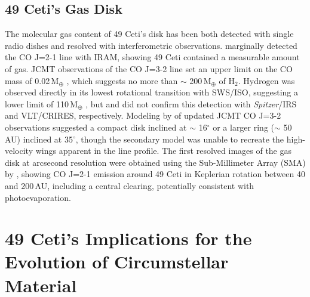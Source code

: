 
\subsection{49 Ceti's Gas Disk}

The molecular gas content of 49 Ceti's disk has been both detected with single radio dishes and resolved with interferometric observations. \cite{Zuck95} marginally detected the CO J=2-1 line with IRAM, showing 49 Ceti contained a measurable amount of gas. JCMT observations of the CO J=3-2 line set an upper limit on the CO mass of 0.02\,M$_{\oplus}$ \citep{Coul98}, which suggests no more than $\sim$ 200\,M$_{\oplus}$ of H$_{2}$. Hydrogen was observed directly in its lowest rotational transition with SWS/ISO, suggesting a lower limit of 110\,M$_{\oplus}$ \citep{Thi01a}, but \cite{Chen06} and \cite{Carm07} did not confirm this detection with \textit{Spitzer}/IRS and VLT/CRIRES, respectively. Modeling by \cite{Dent05} of updated JCMT CO J=3-2 observations suggested a compact disk inclined at $\sim$ 16$^{\circ}$ or a larger ring ($\sim$ 50\,AU) inclined at 35$^{\circ}$, though the secondary model was unable to recreate the high-velocity wings apparent in the line profile. The first resolved images of the gas disk at arcsecond resolution were obtained using the Sub-Millimeter Array (SMA) by \cite{Hugh08}, showing CO J=2-1 emission around 49 Ceti in Keplerian rotation between 40 and 200\,AU, including a central clearing, potentially consistent with photoevaporation.

\section{49 Ceti's Implications for the Evolution of Circumstellar Material}

